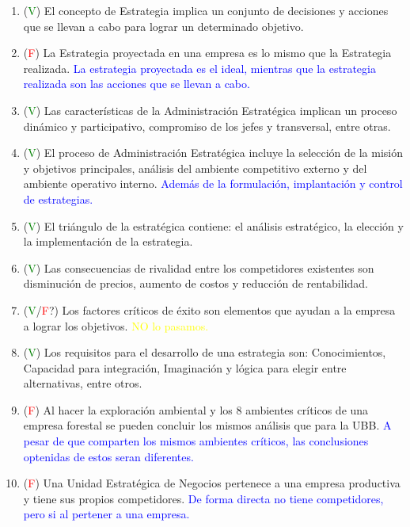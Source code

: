 \documentclass{templateNote}
\begin{document}
\begin{enumerate}
    \item (\textcolor{green}{V}) El concepto de Estrategia implica un conjunto de decisiones y acciones que se llevan a cabo para lograr un determinado objetivo.
    
    \item (\textcolor{red}{F}) La Estrategia proyectada en una empresa es lo mismo que la Estrategia realizada.\newline
    \textcolor{blue}{
        La estrategia proyectada es el ideal, mientras que la estrategia realizada son las acciones que se llevan a cabo.
    }
    
    \item (\textcolor{green}{V}) Las características de la Administración Estratégica implican un proceso dinámico y participativo, compromiso de los jefes y transversal, entre otras.
    
    \item (\textcolor{green}{V}) El proceso de Administración Estratégica incluye la selección de la misión y objetivos principales, análisis del ambiente competitivo externo y del ambiente operativo interno.\newline
    \textcolor{blue}{
        Además de la formulación, implantación y control de estrategias.
    }
    \item (\textcolor{green}{V}) El triángulo de la estratégica contiene: el análisis estratégico, la elección y la implementación de la estrategia.
    
    \item (\textcolor{green}{V}) Las consecuencias de rivalidad entre los competidores existentes son disminución de precios, aumento de costos y reducción de rentabilidad.
    
    \item (\textcolor{green}{V}/\textcolor{red}{F}?) Los factores críticos de éxito son elementos que ayudan a la empresa a lograr los objetivos. 
    \textcolor{yellow}{
        NO lo pasamos.
    }
    \item (\textcolor{green}{V}) Los requisitos para el desarrollo de una estrategia son: Conocimientos, Capacidad para integración, Imaginación y lógica para elegir entre alternativas, entre otros.
    
    \item (\textcolor{red}{F}) Al hacer la exploración ambiental y los 8 ambientes críticos de una empresa forestal se pueden concluir los mismos análisis que para la UBB.\newline
    \textcolor{blue}{
        A pesar de que comparten los mismos ambientes críticos, las conclusiones optenidas de estos seran diferentes.
    }
    \item (\textcolor{red}{F}) Una Unidad Estratégica de Negocios pertenece a una empresa productiva y tiene sus propios competidores.\newline
    \textcolor{blue}{
        De forma directa no tiene competidores, pero si al pertener a una empresa.
    }
\end{enumerate}
\end{document}
